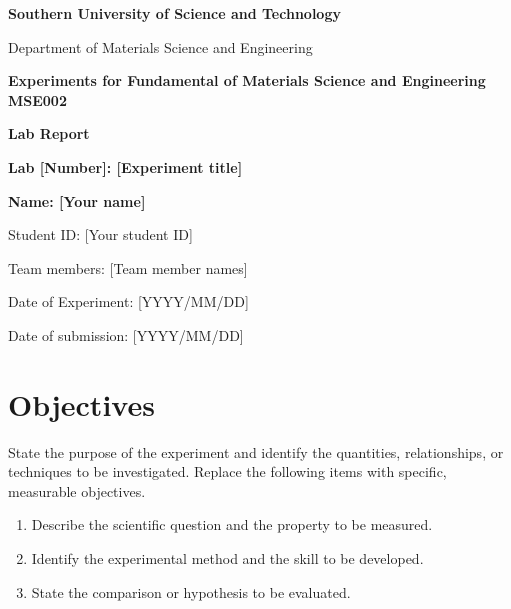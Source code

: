 \documentclass[12pt]{article}
\newcommand{\University}{Southern University of Science and Technology}
\newcommand{\Department}{Department of Materials Science and Engineering}
\newcommand{\Course}{Experiments for Fundamental of Materials Science and Engineering MSE002}
\newcommand{\LabNumber}{[Number]}
\newcommand{\ExperimentTitle}{[Experiment title]}
\newcommand{\StudentName}{[Your name]}
\newcommand{\StudentID}{[Your student ID]}
\newcommand{\TeamMembers}{[Team member names]}
\newcommand{\ExperimentDate}{[YYYY/MM/DD]}
\newcommand{\SubmissionDate}{[YYYY/MM/DD]}
\begin{document}
\hypersetup{pageanchor=false}
\begin{titlepage}
  \thispagestyle{empty}
  {\noindent\fontsize{15}{18}\selectfont\bfseries
   \University\par
   \noindent\Department\par}
  \vspace{1.7cm}
  \begin{center}
    {\fontsize{18}{22}\selectfont\bfseries\color{courseblue}\Course\par}
    \vspace{1.7cm}
    {\fontsize{28}{34}\selectfont\bfseries Lab Report\par}
    \vspace{0.6cm}
    {\fontsize{22}{27}\selectfont\bfseries Lab \LabNumber: \ExperimentTitle\par}
  \end{center}
  \vspace{1.8cm}
  \begin{flushright}
    \fontsize{15}{21}\selectfont\bfseries
    Name: \StudentName\par
    Student ID: \StudentID\par
    Team members: \TeamMembers\par
    Date of Experiment: \ExperimentDate\par
    Date of submission: \SubmissionDate\par
  \end{flushright}
  \vfill
\end{titlepage}
\setcounter{page}{1}
\hypersetup{pageanchor=true}


\section{Objectives}
State the purpose of the experiment and identify the quantities, relationships,
or techniques to be investigated. Replace the following items with specific,
measurable objectives.
\begin{enumerate}
  \item Describe the scientific question and the property to be measured.
  \item Identify the experimental method and the skill to be developed.
  \item State the comparison or hypothesis to be evaluated.
\end{enumerate}
\end{document}
